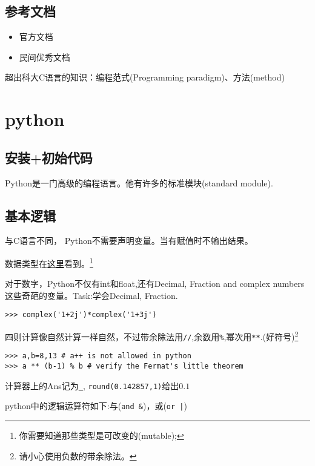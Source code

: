 \documentclass[11pt]{amsart}
\begin{document}
\subsection{参考文档}
\begin{itemize}
	\item 官方文档
	\item 民间优秀文档
\end{itemize}


超出科大C语言的知识：编程范式(Programming paradigm)、方法(method)



\section{python}
\subsection{安装+初始代码}
Python是一门高级的编程语言。他有许多的标准模块(standard module).
\subsection{基本逻辑}
与C语言不同， Python不需要声明变量。当有赋值时不输出结果。

数据类型在\href{https://docs.python.org/3/tutorial/introduction.html#id3}{这里}看到。\footnote{你需要知道那些类型是可改变的(mutable);}

对于数字，Python不仅有int和float,还有Decimal, Fraction and complex numbers这些奇葩的变量。Task:学会Decimal, Fraction.
\begin{lstlisting}[language=iPython]
>>> complex('1+2j')*complex('1+3j')
\end{lstlisting}
四则计算像自然计算一样自然，不过带余除法用\lstinline|//|,余数用\lstinline|%|,幂次用\lstinline|**|.(好符号)\footnote{请小心使用负数的带余除法。}
\begin{lstlisting}[language=iPython]
>>> a,b=8,13 # a++ is not allowed in python
>>> a ** (b-1) % b # verify the Fermat's little theorem
\end{lstlisting}
计算器上的Ans记为\lstinline|_|, \lstinline|round(0.142857,1)|给出$0.1$

python中的逻辑运算符如下:与(\lstinline|and &|)，或(\lstinline{or |})
\end{document}
